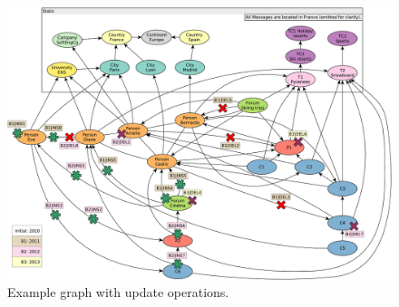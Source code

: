 \begin{figure}[ht]
    \centering
    \includegraphics[width=\textwidth]{figures/example-graph-with-updates}
    \caption{Example graph with update operations.}
    \label{fig:example-graph-with-updates}
\end{figure}
